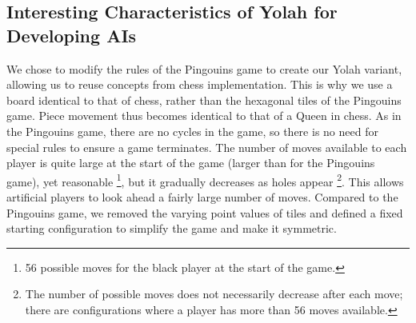 \documentclass[12pt,a4paper,twoside,openright]{book}
\begin{document}
\subsection{Interesting Characteristics of Yolah for Developing AIs}


We chose to modify the rules of the Pingouins game to create our Yolah variant, allowing us to reuse concepts from chess implementation. This is why we use a board identical to that of chess, rather than the hexagonal tiles of the Pingouins game.
Piece movement thus becomes identical to that of a Queen in chess.
As in the Pingouins game, there are no cycles in the game, so there is no need for special rules to ensure a game terminates.
The number of moves available to each player is quite large at the start of the game (larger than for the Pingouins game), yet reasonable \footnote{56 possible moves for the black player at the start of the game.}, but it gradually decreases as holes appear \footnote{The number of possible moves does not necessarily decrease after each move; there are configurations where a player has more than 56 moves available.}. This allows artificial players to look ahead a fairly large number of moves.
Compared to the Pingouins game, we removed the varying point values of tiles and defined a fixed starting configuration to simplify the game and make it symmetric. 
\end{document}
